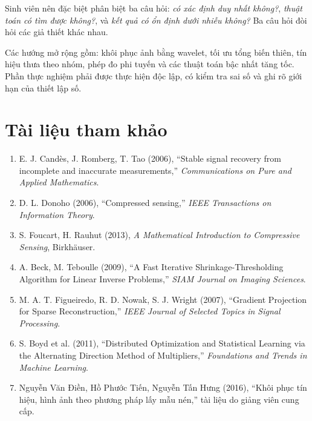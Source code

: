\documentclass[12pt,a4paper]{article}
\begin{document}
Sinh viên nên đặc biệt phân biệt ba câu hỏi: \emph{có xác định duy nhất không?}, \emph{thuật toán có tìm được không?}, và \emph{kết quả có ổn định dưới nhiễu không?} Ba câu hỏi đòi hỏi các giả thiết khác nhau.

Các hướng mở rộng gồm: khôi phục ảnh bằng wavelet, tối ưu tổng biến thiên, tín hiệu thưa theo nhóm, phép đo phi tuyến và các thuật toán bậc nhất tăng tốc. Phần thực nghiệm phải được thực hiện độc lập, có kiểm tra sai số và ghi rõ giới hạn của thiết lập số.
\clearpage
\section{Tài liệu tham khảo}
\begin{enumerate}
\item E. J. Candès, J. Romberg, T. Tao (2006), ``Stable signal recovery from incomplete and inaccurate measurements,'' \emph{Communications on Pure and Applied Mathematics}.
\item D. L. Donoho (2006), ``Compressed sensing,'' \emph{IEEE Transactions on Information Theory}.
\item S. Foucart, H. Rauhut (2013), \emph{A Mathematical Introduction to Compressive Sensing}, Birkhäuser.
\item A. Beck, M. Teboulle (2009), ``A Fast Iterative Shrinkage-Thresholding Algorithm for Linear Inverse Problems,'' \emph{SIAM Journal on Imaging Sciences}.
\item M. A. T. Figueiredo, R. D. Nowak, S. J. Wright (2007), ``Gradient Projection for Sparse Reconstruction,'' \emph{IEEE Journal of Selected Topics in Signal Processing}.
\item S. Boyd et al. (2011), ``Distributed Optimization and Statistical Learning via the Alternating Direction Method of Multipliers,'' \emph{Foundations and Trends in Machine Learning}.
\item Nguyễn Văn Điền, Hồ Phước Tiến, Nguyễn Tấn Hưng (2016), ``Khôi phục tín hiệu, hình ảnh theo phương pháp lấy mẫu nén,'' tài liệu do giảng viên cung cấp.
\end{enumerate}
\end{document}
